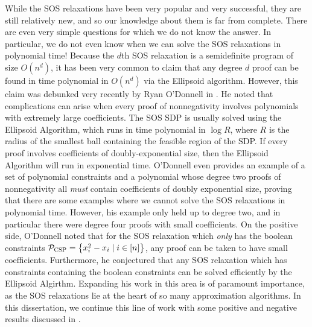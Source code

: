 While the SOS relaxations have been very popular and very successful, they are still relatively new, and so our knowledge about them is far from complete. 
There are even very simple questions for which we do not know the answer.
In particular, we do not even know when we can solve the SOS relaxations in polynomial time! 
Because the $d$th SOS relaxation is a semidefinite program of size $O(n^d)$, it has been very common to claim that any degree $d$ proof can be found in time polynomial in $O(n^d)$ via the Ellipsoid algorithm. However, this claim was debunked very recently by Ryan O'Donnell in \cite{ODon16}. 
He noted that complications can arise when every proof of nonnegativity involves polynomials with extremely large coefficients.
The SOS SDP is usually solved using the Ellipsoid Algorithm, which runs in time polynomial in $\log R$, where $R$ is the radius of the smallest ball containing the feasible region of the SDP. 
If every proof involves coefficients of doubly-exponential size, then the Ellipsoid Algorithm will run in exponential time. 
O'Donnell even provides an example of a set of polynomial constraints and a polynomial whose degree two proofs of nonnegativity all \emph{must} contain coefficients of doubly exponential size, proving that there are some examples where we cannot solve the SOS relaxations in polynomial time.
However, his example only held up to degree two, and in particular there were degree four proofs with small coefficients. 
On the positive side, O'Donnell noted that for the SOS relaxation which \emph{only} has the boolean constraints $\mathcal P_{\textsc{CSP}} = \left\{x_i^2 - x_i \mid i \in [n]\right\}$, any proof can be taken to have small coefficients. 
Furthermore, he conjectured that any SOS relaxation which has constraints containing the boolean constraints can be solved efficiently by the Ellipsoid Algirthm.
Expanding his work in this area is of paramount importance, as the SOS relaxations lie at the heart of so many approximation algorithms. 
In this dissertation, we continue this line of work with some positive and negative results discussed in .


